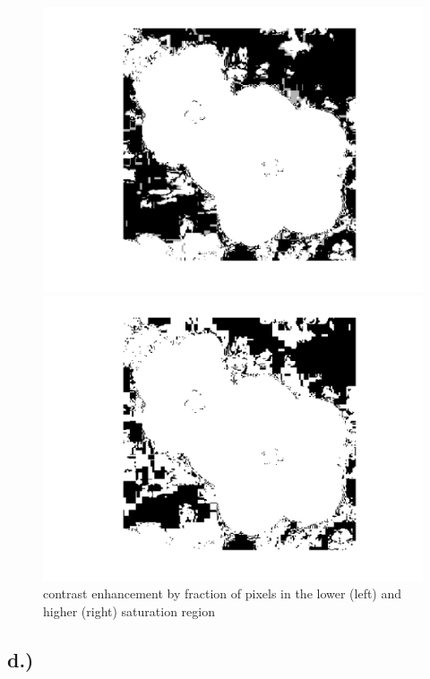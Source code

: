\documentclass{scrartcl}
\begin{document}
\begin{figure}[htp!]
	\begin{minipage}[t]{0.5\textwidth}
		\includegraphics[width=\textwidth]{flower_low.png}
	\end{minipage}
	\begin{minipage}[t]{0.5\textwidth}
		\includegraphics[width=\textwidth]{flower_high.png}
	\end{minipage}
	\caption{contrast enhancement by fraction of pixels in the lower (left) and higher (right) saturation region}
\end{figure}

\subsection*{d.)}
\end{document}
